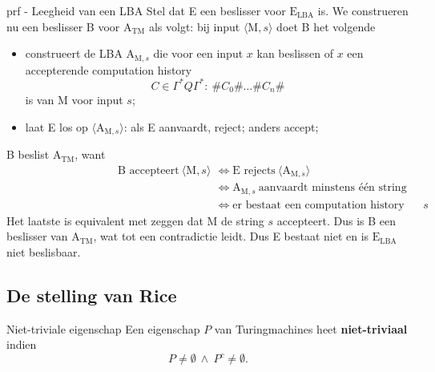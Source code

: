\begin{prf}{prf - Leegheid van een LBA}
    Stel dat E een beslisser voor $\text{E}_{\text{LBA}}$ is. We construeren nu een beslisser B voor $\text{A}_{\text{TM}}$ als volgt: bij input $\langle \text{M}, s \rangle$ doet B het volgende
    \begin{itemize}
        \item construeert de LBA $\text{A}_{\text{M},s}$ die voor een input $x$ kan beslissen of $x$ een accepterende computation history
        \begin{equation*}
            C \in \Gamma^*Q\Gamma^*: \ \#C_0\#\ldots\#C_n\#
        \end{equation*}
        is van M voor input $s$;
        \item laat E los op $\langle \text{A}_{\text{M},s} \rangle$: als E aanvaardt, reject; anders accept;
    \end{itemize}
    B beslist $\text{A}_{\text{TM}}$, want
    \begin{align*}
        \hspace{4cm}
        \text{B accepteert} \ \langle \text{M}, s \rangle  
        &\Leftrightarrow \text{E rejects} \ \langle \text{A}_{\text{M},s} \rangle \\ 
        &\Leftrightarrow \text{A}_{\text{M},s} \ \text{aanvaardt minstens één string} \\
        &\Leftrightarrow \text{er bestaat een computation history van M voor $s$} 
    \end{align*}
    Het laatste is equivalent met zeggen dat M de string $s$ accepteert. Dus is B een beslisser van $\text{A}_{\text{TM}}$, wat tot een contradictie leidt. Dus E bestaat niet en is $\text{E}_{\text{LBA}}$ niet beslisbaar.
\end{prf}

\subsection{De stelling van Rice}

\vspace{0.5cm}

\begin{theo}{Niet-triviale eigenschap}
    Een eigenschap $P$ van Turingmachines heet \textbf{niet-triviaal} indien 
    \begin{equation*}
        P \neq \emptyset \ \land \ P^c \neq \emptyset. 
    \end{equation*}
    \vspace{-0.5cm}
\end{theo}

